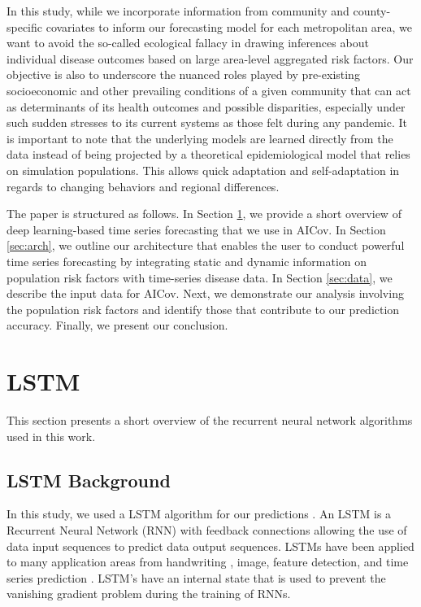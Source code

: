 \documentclass[letterpaper, inpress]{jds} %
\renewcommand{\_}{%
    \textunderscore\hspace{0pt}%
}
\begin{document}
In this study, while we incorporate information from community and
county-specific covariates to inform our forecasting model for each
metropolitan area, we want to avoid the so-called ecological fallacy
in drawing inferences about individual disease outcomes based on large
area-level aggregated risk factors. Our objective is also to
underscore the nuanced roles played by pre-existing socioeconomic and
other prevailing conditions of a given community that can act as
determinants of its health outcomes and possible disparities,
especially under such sudden stresses to its current systems as those
felt during any pandemic.  It is important to note that the underlying
models are learned directly from the data instead of being projected
by a theoretical epidemiological model that relies on simulation
populations. This allows quick adaptation and self-adaptation in
regards to changing behaviors and regional differences.

The paper is structured as follows. In Section \ref{sec:lstm-theory},
we provide a short overview of deep learning-based time series
forecasting that we use in AICov. In Section \ref{sec:arch}, we
outline our architecture that enables the user to conduct powerful
time series forecasting by integrating static and dynamic information
on population risk factors with time-series disease data. In Section
\ref{sec:data}, we describe the input data for AICov. Next, we
demonstrate our analysis involving the population risk factors and
identify those that contribute to our prediction accuracy. Finally, we
present our conclusion.


\section{LSTM}
\label{sec:lstm-theory}

This section presents a short overview of the recurrent neural network
algorithms used in this work.


\subsection{LSTM Background}
\label{sec:lstm-background}

In this study, we used a LSTM algorithm for our predictions
\citep{www-keras-lstm,Hochreiter1997-dk}. An LSTM is a Recurrent
Neural Network (RNN) \citep{Rumelhart1986-li} with feedback
connections allowing the use of data input sequences to predict data
output sequences. LSTMs have been applied to many application areas
from handwriting \citep{Graves2009-qb}, image, feature detection, and
time series prediction \citep{Schmidhuber2005-oy}. LSTM's have an
internal state that is used to prevent the vanishing gradient problem
\citep{Hochreiter1991-mp} during the training of RNNs.
\end{document}
